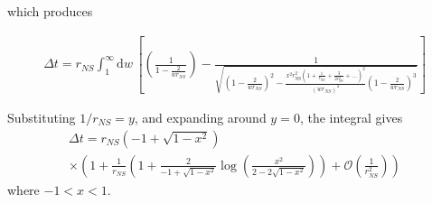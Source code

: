 \documentclass[modern]{aastex631}
\newcommand{\rNS}{r_\mathrm{NS}}
\begin{document}
which produces 
%
\begin{linenomath}\begin{align}
    \label{eq:tdelay-with-x}
    \Delta t = r_{NS} \int_{1}^{\infty} \mathrm{d}w \, \left[\left(\frac{1}{1-\frac{2}{wr_{NS}}}\right) - \frac{1}{\sqrt{\left(1-\frac{2}{wr_{NS}}\right)^2 - \frac{x^2 \rNS^2 \left( 1 + \frac{1}{\rNS} + \frac{3}{2 \rNS^2} + \ldots \right)^2}{(wr_{NS})^2}\left(1-\frac{2}{wr_{NS}}\right)^3}}\right]
\end{align}\end{linenomath}
%
Substituting $1/r_{NS} = y$, and expanding around $y=0$, the integral gives
%
\begin{multline}
    \label{eq:tdelay-solved}
    \Delta t = r_{NS} \left( -1 + \sqrt{1 - x^2} \right) \\ \times \left( 1 + \frac{1}{r_{NS}} \left( 1  + \frac{2}{-1 + \sqrt{1 - x^2}} \log\left( \frac{x^2}{2 - 2 \sqrt{1 - x^2}} \right) \right) + \mathcal{O}\left( \frac{1}{r_{NS}^2} \right) \right)
\end{multline}
where $-1<x<1$.

\end{document}
